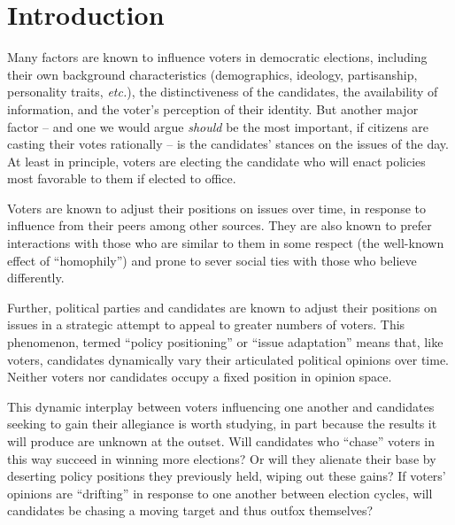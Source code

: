 \section{Introduction}
\label{sec:intro}

Many factors are known to influence voters in democratic elections, including
their own background characteristics (demographics, ideology, partisanship,
personality traits, \textit{etc.}), the distinctiveness of the candidates, the
availability of information, and the voter's perception of their
identity.\cite[pp.3-4]{redlawsk_citizens_2020} But another major factor -- and
one we would argue \textit{should} be the most important, if citizens are
casting their votes rationally -- is the candidates' stances on the issues of
the day. At least in principle, voters are electing the candidate who will
enact policies most favorable to them if elected to office.

Voters are known to adjust their positions on issues over time, in response to
influence from their
peers\cite{dandekar_biased_2013,mcpherson_birds_2001,mas_differentiation_2013}
among other sources. They are also known to prefer interactions with those who
are similar to them in some respect (the well-known effect of
``homophily''\cite{boucher_structural_2015,centola_homophily_2007}) and prone
to sever social ties with those who believe
differently\cite{skoric_what_2018,paik_defriending_2023}.

Further, political parties and candidates are known to adjust their positions
on issues in a strategic attempt to appeal to greater numbers of
voters.\cite{worcester_voter_2006} This phenomenon, termed ``policy
positioning''\cite{mcelroy_policy_2012} or ``issue
adaptation''\cite{benoit_issue_2002} means that, like voters, candidates
dynamically vary their articulated political opinions over time. Neither voters
nor candidates occupy a fixed position in opinion space.

This dynamic interplay between voters influencing one another and candidates
seeking to gain their allegiance is worth studying, in part because the results
it will produce are unknown at the outset. Will candidates who ``chase'' voters
in this way succeed in winning more elections? Or will they alienate their base
by deserting policy positions they previously held, wiping out these gains? If
voters' opinions are ``drifting'' in response to one another between election
cycles, will candidates be chasing a moving target and thus outfox themselves?

